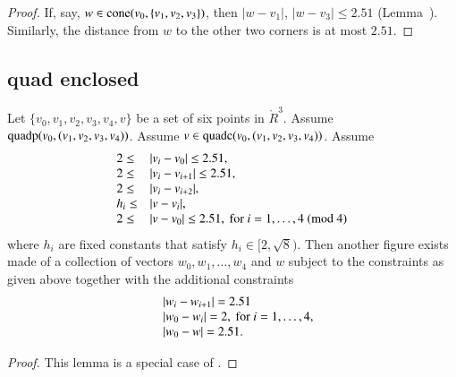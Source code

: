 \begin{tarskidata}
\begin{tarski}
\begin{proof}
If, say, $w\in {\operatorname{cone}}(v_0,\{v_1,v_2,v_3\})$, then
$|w-v_1|$, $|w-v_3|\le 2.51$ (Lemma~).
 Similarly, the distance from
$w$ to the other two corners is at most $2.51$.
\end{proof}
\end{tarski}







\begin{tarski}
\subsection{quad enclosed}

\begin{lemma}
Let $\{v_0,v_1,v_2,v_3,v_4,v\}$ be a set of six points in
$\ring{R}^3$.  Assume ${\operatorname{quadp}}(v_0,(v_1,v_2,v_3,v_4))$.
Assume $v\in {\operatorname{quadc}}(v_0,(v_1,v_2,v_3,v_4))$.
Assume 
    $$\begin{array}{lll}
    2\le &|v_i-v_0|\le 2.51,\\
    2\le&|v_i-v_{i+1}|\le 2.51, \\
    2\le&|v_i-v_{i+2}|,\\
    h_i\le &|v-v_i|, \\
    2\le &|v-v_0|\le 2.51, \hbox{ for }
        i=1,\ldots,4 \ (\hbox{mod } 4)\\
    \end{array}
    $$
where $h_i$ are fixed constants that satisfy
$h_i\in[2,\sqrt{8})$.  
Then another figure exists made of
a collection of vectors $w_0,w_1,\ldots,w_4$ and $w$ subject to
the constraints as given above together with the additional constraints
    $$\begin{array}{lll}
    &|w_i-w_{i+1}|=2.51\\
    &|w_0-w_i|=2, \hbox { for } i=1,\ldots,4,\\
    &|w_0-w|=2.51.
    \end{array}
    $$
\end{lemma}

\begin{proof} This  lemma is a special case of
\cite[Lemma~4.3]{part1}.
\end{proof}
\end{tarski}






\end{tarskidata}
